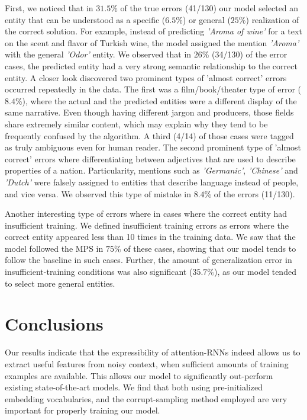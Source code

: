 \documentclass[11pt,a4paper]{article}
\begin{document}
	First, we noticed that in $31.5$\% of the true errors (41/130) our model selected an entity that can be understood as a specific ($6.5$\%) or general ($25$\%) realization of the correct solution. For example, instead of predicting \textit{'Aroma of wine'} for a text on the scent and flavor of Turkish wine, the model assigned the mention \textit{'Aroma'} with the general \textit{'Odor'} entity. We observed that in $26$\% (34/130) of the error cases, the predicted entity had a very strong semantic relationship to the correct entity. A closer look discovered two prominent types of 'almost correct' errors occurred repeatedly in the data. The first was a film/book/theater type of error ($8.4$\%), where the actual and the predicted entities were a different display of the same narrative. Even though having different jargon and producers, those fields share extremely similar content, which may explain why they tend to be frequently confused by the algorithm. A third (4/14) of those cases were tagged as truly ambiguous even for human reader. The second prominent type of 'almost correct' errors where differentiating between adjectives that are used to describe properties of a nation. Particularity, mentions such as \textit{'Germanic'}, \textit{'Chinese'} and \textit{'Dutch'} were falsely assigned to entities that describe language instead of people, and vice versa. We observed this type of mistake in $8.4$\% of the errors (11/130).
	
	Another interesting type of errors where in cases where the correct entity had insufficient training. We defined insufficient training errors as errors where the correct entity appeared less than 10 times in the training data. We saw that the model followed the MPS in $75$\% of these cases, showing that our model tends to follow the baseline in such cases. Further, the amount of generalization error in insufficient-training conditions was also significant ($35.7\%$), as our model tended to select more general entities.
	
	\section{Conclusions}
	Our results indicate that the expressibility of attention-RNNs indeed allows us to extract useful features from noisy context, when sufficient amounts of training examples are available. This allows our model to significantly out-perform existing state-of-the-art models. We find that both using pre-initialized embedding vocabularies, and the corrupt-sampling method employed are very important for properly training our model.
	
\end{document}
